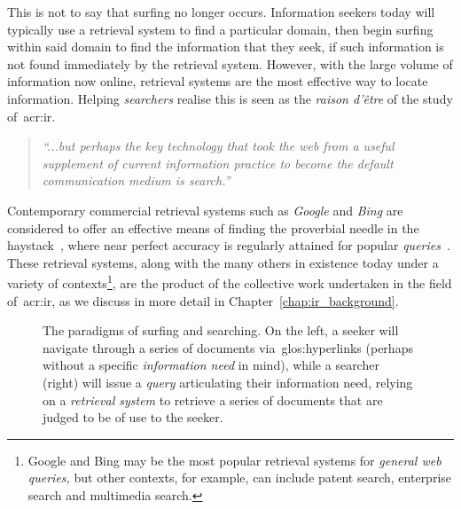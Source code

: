 This is not to say that surfing no longer occurs. Information seekers today will typically use a retrieval system to find a particular domain, then begin surfing within said domain to find the information that they seek, if such information is not found immediately by the retrieval system. However, with the large volume of information now online, retrieval systems are the most effective way to locate information. Helping \emph{searchers} realise this is seen as the \emph{raison d'\^{e}tre} of the study of~\gls{acr:ir}.

\begin{quote}
    \emph{``...but perhaps the key technology that took the web from a useful supplement of current information practice to become the default communication medium is search.''}
\end{quote}

Contemporary commercial retrieval systems such as \emph{Google} and \emph{Bing} are considered to offer an effective means of finding the proverbial needle in the haystack~\citep{wilson2010keyword_search}, where near perfect accuracy is regularly attained for popular \emph{queries}~\citep{vaughan2004new_measurements}. These retrieval systems, along with the many others in existence today under a variety of contexts\footnote{Google and Bing may be the most popular retrieval systems for \emph{general web queries,} but other contexts, for example, can include patent search, enterprise search and multimedia search.}, are the product of the collective work undertaken in the field of~\gls{acr:ir}, as we discuss in more detail in Chapter~\ref{chap:ir_background}.

\begin{figure}[t!]
    \centering
    \caption[Surfing vs. searching: illustrations of the two paradigms]{The paradigms of surfing and searching. On the left, a seeker will navigate through a series of documents via~\glspl{glos:hyperlink} (perhaps without a specific \emph{information need} in mind), while a searcher (right) will issue a \emph{query} articulating their information need, relying on a \emph{retrieval system} to retrieve a series of documents that are judged to be of use to the seeker.}
    \label{fig:ch1-surfing}
\end{figure}

